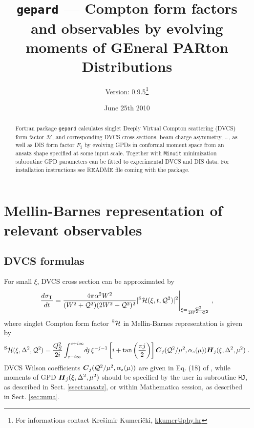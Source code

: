 \documentclass[12pt]{article}
\begin{document}
\title{\texttt{gepard} --- Compton form factors and observables
                            by evolving moments of GEneral PARton 
                            Distributions}
\author{Version: 0.9.5\footnote{For 
informations contact Kre\v{s}imir Kumeri\v{c}ki, \url{kkumer@phy.hr}}}
\date{June 25th 2010}
\maketitle

\begin{abstract}
Fortran package \texttt{gepard} calculates singlet Deeply Virtual Compton
scattering (DVCS) form factor
$\mathcal{H}$, and corresponding DVCS cross-sections, beam charge
asymmetry, \ldots,  as well as
DIS form factor $F_2$ by evolving GPDs in conformal moment space 
from an ansatz shape specified at some input scale.  Together
with \texttt{Minuit} minimization subroutine GPD parameters can be fitted to
experimental DVCS and DIS data. For installation instructions
see README file coming with the package.
\end{abstract}

\tableofcontents
\clearpage

\section{Mellin-Barnes representation of relevant observables}

\subsection{DVCS formulas}  

For small $\xi$, DVCS cross section can be approximated by 
\begin{equation}
\frac{d \sigma_{\rm T}}{d t} = \frac{4 \pi \alpha^2 W^2}{(W^2 + \mathcal{Q}^2)
(2 W^2 + \mathcal{Q}^2)^2} | ^{\rm S}\mathcal{H}(\xi, t, \mathcal{Q}^2)|^2 \Bigg|_{\xi
= \frac{\mathcal{Q}^2}{2 W^2 + \mathcal{Q}^2}} \;,
\label{eq:parsigma}
\end{equation}
where singlet Compton form factor $^{\rm S}\mathcal{H}$ in Mellin-Barnes representation is given by
\begin{equation}
{^{\rm S}{\cal H}}(\xi,\Delta^2,{\cal Q}^2)
= \frac{Q_{S}^2}{2i}\int_{c-i \infty}^{c+ i \infty}\!
dj\,\xi^{-j-1} \left[i + \tan \left(\frac{\pi j}{2}\right) \right]
\mbox{\boldmath $C$}_{j}({\cal Q}^2/\mu^2,\alpha_s(\mu)) 
\mbox{\boldmath $H$}_{j} (\xi,\Delta^2,\mu^2) \;.
\label{eq:CFF}
\end{equation}
DVCS Wilson coefficients $\mbox{\boldmath $C$}_{j}({\cal Q}^2/\mu^2,\alpha_s(\mu))$
are given in Eq. (18) of \cite{Kumericki:2006xx}, while moments of
GPD $\mbox{\boldmath $H$}_{j} (\xi,\Delta^2,\mu^2)$ should be specified
by the user in subroutine \texttt{HJ}, as described in Sect. \ref{ssect:ansatz}, or
within Mathematica session, as described in Sect. \ref{sec:mma}.
\end{document}
